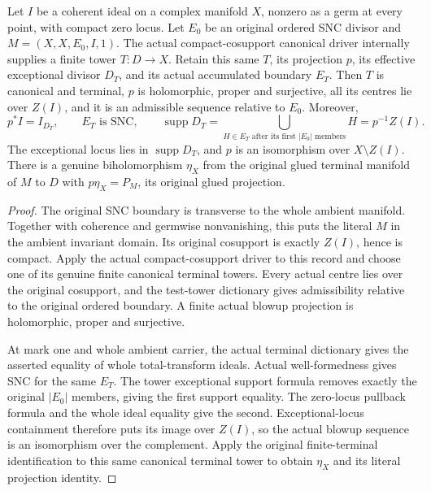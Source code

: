 \begin{theorem}
\label{hir:original-canonical-boundary-principalization-compact-cosupport}
\leanok
Let $I$ be a coherent ideal on a complex manifold $X$, nonzero as a germ
at every point, with compact zero locus.  Let $E_0$ be an original ordered
SNC divisor and $M=(X,X,E_0,I,1)$.  The actual compact-cosupport canonical
driver internally supplies a finite tower $T:D\to X$.  Retain this same
$T$, its projection $p$, its effective exceptional divisor $D_T$, and its
actual accumulated boundary $E_T$.  Then $T$ is canonical and terminal,
$p$ is holomorphic, proper and surjective, all its centres lie over
$Z(I)$, and it is an admissible sequence relative to $E_0$.  Moreover,
\[
 p^*I=I_{D_T},\qquad E_T\text{ is SNC},\qquad
 \operatorname{supp}D_T
   =\bigcup_{H\in E_T\text{ after its first }|E_0|\text{ members}} H
   =p^{-1}Z(I).
\]
The exceptional locus lies in $\operatorname{supp}D_T$, and $p$ is an
isomorphism over $X\setminus Z(I)$.  There is a genuine biholomorphism
$\eta_X$ from the original glued terminal manifold of $M$ to $D$ with
$p\eta_X=P_M$, its original glued projection.
\end{theorem}
\begin{proof}
The original SNC boundary is transverse to the whole ambient manifold.
Together with coherence and germwise nonvanishing, this puts the literal
$M$ in the ambient invariant domain.  Its original cosupport is exactly
$Z(I)$, hence is compact.  Apply the actual compact-cosupport driver to
this record and choose one of its genuine finite canonical terminal
towers.  Every actual centre lies over the original cosupport, and the
test-tower dictionary gives admissibility relative to the original
ordered boundary.  A finite actual blowup projection is holomorphic,
proper and surjective.

At mark one and whole ambient carrier, the actual terminal dictionary
gives the asserted equality of whole total-transform ideals.  Actual
well-formedness gives SNC for the same $E_T$.  The tower exceptional
support formula removes exactly the original $|E_0|$ members, giving the
first support equality.  The zero-locus pullback formula and the whole
ideal equality give the second.  Exceptional-locus containment therefore
puts its image over $Z(I)$, so the actual blowup sequence is an
isomorphism over the complement.  Apply the original finite-terminal
identification to this same canonical terminal tower to obtain
$\eta_X$ and its literal projection identity.
\end{proof}

